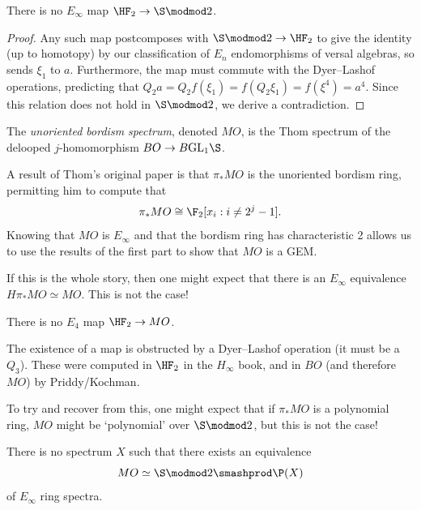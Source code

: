 \documentclass{article}
\begin{document}
\begin{theorem}
    There is no $E_\infty$ map $\HF_2 \to \S \modmod 2$.    
\end{theorem}

\begin{proof}
    Any such map postcomposes with $\S \modmod 2 \to \HF_2$ to give the identity (up to homotopy) by our classification of $E_n$ endomorphisms of versal algebras, so sends $\xi_1$ to $a$.
    Furthermore, the map must commute with the Dyer--Lashof operations, predicting that $Q_2 a = Q_2 f(\xi_1) = f(Q_2\xi_1) = f(\xi^4) = a^4$.
    Since this relation does not hold in $\S \modmod 2$, we derive a contradiction.
\end{proof}

\begin{definition}
    The \textit{unoriented bordism spectrum}, denoted $MO$, is the Thom spectrum of the delooped $j$-homomorphism $BO \to B\text{GL}_1\S$.
\end{definition}

A result of Thom's original paper is that $\pi_* MO$ is the unoriented bordism ring, permitting him to compute that
\[
    \pi_* MO \cong \F_2[x_i : i \neq 2^j - 1].
\]
Knowing that $MO$ is $E_\infty$ and that the bordism ring has characteristic 2 allows us to use the results of the first part to show that $MO$ is a GEM.

If this is the whole story, then one might expect that there is an $E_\infty$ equivalence $H\pi_* MO \simeq MO$.
This is not the case!

\begin{theorem}
    There is no $E_4$ map $\HF_2 \to MO$.
\end{theorem}

The existence of a map is obstructed by a Dyer--Lashof operation (it must be a $Q_3$).
These were computed in $\HF_2$ in the $H_\infty$ book, and in $BO$ (and therefore $MO$) by Priddy/Kochman.

To try and recover from this, one might expect that if $\pi_* MO$ is a polynomial ring, $MO$ might be `polynomial' over $\S \modmod 2$, but this is not the case!

\begin{theorem}
    There is no spectrum $X$ such that there exists an equivalence
    \[
        MO \simeq \S \modmod 2 \smashprod \P(X)
    \]
    of $E_\infty$ ring spectra.
\end{theorem}
\end{document}
